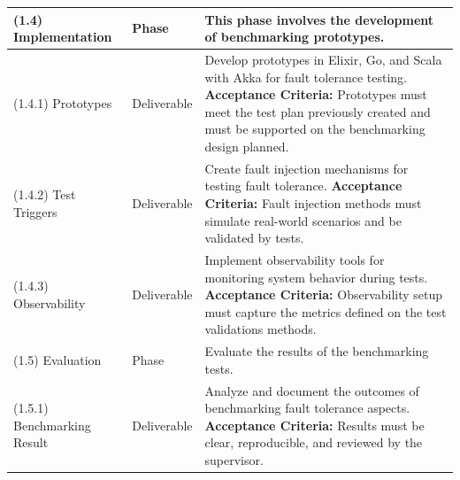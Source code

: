 \begin{longtable}{|p{3cm}|p{2.5cm}|p{8cm}|}
    (1.4) Implementation           & Phase                 & This phase involves the development of benchmarking prototypes.                                                                                                                                                                                                                                                                                           \\ \hline
    (1.4.1) Prototypes             & Deliverable           & Develop prototypes in Elixir, Go, and Scala with Akka for fault tolerance testing. \newline \textbf{Acceptance Criteria:} Prototypes must meet the test plan previously created and must be supported on the benchmarking design planned.                                                                                                                 \\ \hline
    (1.4.2) Test Triggers          & Deliverable           & Create fault injection mechanisms for testing fault tolerance. \newline \textbf{Acceptance Criteria:} Fault injection methods must simulate real-world scenarios and be validated by tests.                                                                                                                                                               \\ \hline
    (1.4.3) Observability          & Deliverable           & Implement observability tools for monitoring system behavior during tests. \newline \textbf{Acceptance Criteria:} Observability setup must capture the metrics defined on the test validations methods.                                                                                                                                                   \\ \hline
    \hline %

    (1.5) Evaluation               & Phase                 & Evaluate the results of the benchmarking tests.                                                                                                                                                                                                                                                                                                           \\ \hline
    (1.5.1) Benchmarking Result    & Deliverable           & Analyze and document the outcomes of benchmarking fault tolerance aspects. \newline \textbf{Acceptance Criteria:} Results must be clear, reproducible, and reviewed by the supervisor.                                                                                                                                                                    \\ \hline
    \hline %


\end{longtable}
